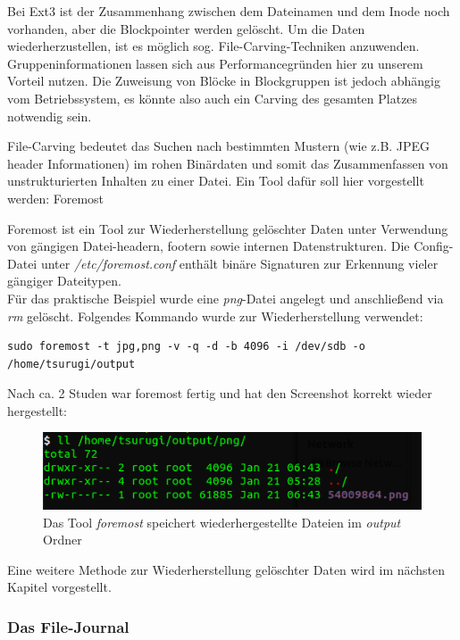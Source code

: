 Bei Ext3 ist der Zusammenhang zwischen dem Dateinamen und dem Inode noch vorhanden, aber die Blockpointer werden gelöscht. Um die Daten wiederherzustellen, ist es möglich  sog. File-Carving-Techniken anzuwenden. Gruppeninformationen lassen sich aus Performancegründen hier zu unserem Vorteil nutzen. Die Zuweisung von Blöcke in Blockgruppen ist jedoch abhängig vom Betriebssystem, es könnte also auch ein Carving des gesamten Platzes notwendig sein.

File-Carving bedeutet das Suchen nach bestimmten Mustern (wie z.B. JPEG header Informationen) im rohen Binärdaten und somit das Zusammenfassen von unstrukturierten Inhalten zu einer Datei.
Ein Tool dafür soll hier vorgestellt werden: Foremost \cite{Foremost.07.01.2022}

Foremost ist ein Tool zur Wiederherstellung gelöschter Daten unter Verwendung von gängigen Datei-headern, footern sowie internen Datenstrukturen. Die Config-Datei unter \textit{/etc/foremost.conf} enthält binäre Signaturen zur Erkennung vieler gängiger Dateitypen.\\

Für das praktische Beispiel wurde eine \textit{png}-Datei angelegt und anschließend via \textit{rm} gelöscht. Folgendes Kommando wurde zur Wiederherstellung verwendet:

\begin{lstlisting}
sudo foremost -t jpg,png -v -q -d -b 4096 -i /dev/sdb -o /home/tsurugi/output
\end{lstlisting}

Nach ca. 2 Studen war foremost fertig und hat den Screenshot korrekt wieder hergestellt:

\begin{figure}[H]
	\centering
	\includegraphics[width=12cm,keepaspectratio=true]{pictures/foremostsuccess.png}
	\caption{
		Das Tool \textit{foremost} speichert wiederhergestellte Dateien im \textit{output} Ordner
	}
	\label{fig:foremostsuccess}
\end{figure}

Eine weitere Methode zur Wiederherstellung gelöschter Daten wird im nächsten Kapitel vorgestellt.

\subsubsection{Das File-Journal}

